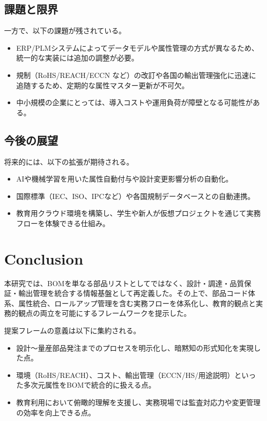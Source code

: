 \documentclass[10pt,conference]{IEEEtran}
\begin{document}
\subsection{課題と限界}
一方で、以下の課題が残されている。
\begin{itemize}
  \item ERP/PLMシステムによってデータモデルや属性管理の方式が異なるため、統一的な実装には追加の調整が必要。
  \item 規制（RoHS/REACH/ECCN など）の改訂や各国の輸出管理強化に迅速に追随するため、定期的な属性マスター更新が不可欠。
  \item 中小規模の企業にとっては、導入コストや運用負荷が障壁となる可能性がある。
\end{itemize}

\subsection{今後の展望}
将来的には、以下の拡張が期待される。
\begin{itemize}
  \item AIや機械学習を用いた属性自動付与や設計変更影響分析の自動化。
  \item 国際標準（IEC、ISO、IPCなど）や各国規制データベースとの自動連携。
  \item 教育用クラウド環境を構築し、学生や新人が仮想プロジェクトを通じて実務フローを体験できる仕組み。
\end{itemize}

\section{Conclusion}
本研究では、BOMを単なる部品リストとしてではなく、設計・調達・品質保証・輸出管理を統合する情報基盤として再定義した。その上で、部品コード体系、属性統合、ロールアップ管理を含む実務フローを体系化し、教育的観点と実務的観点の両立を可能にするフレームワークを提示した。

提案フレームの意義は以下に集約される。
\begin{itemize}
  \item 設計～量産部品発注までのプロセスを明示化し、暗黙知の形式知化を実現した点。
  \item 環境（RoHS/REACH）、コスト、輸出管理（ECCN/HS/用途説明）といった多次元属性をBOMで統合的に扱える点。
  \item 教育利用において俯瞰的理解を支援し、実務現場では監査対応力や変更管理の効率を向上できる点。
\end{itemize}
\end{document}
